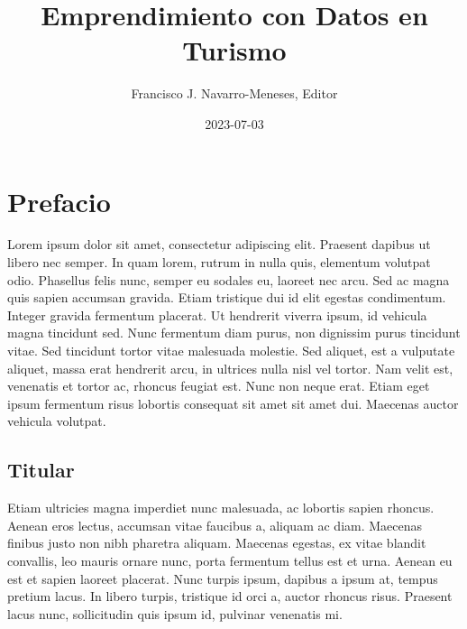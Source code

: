 \documentclass[
  letterpaper,
  DIV=11,
  numbers=noendperiod]{scrreprt}
\title{Emprendimiento con Datos en Turismo}
\author{Francisco J. Navarro-Meneses, Editor}
\date{2023-07-03}
\renewcommand*\contentsname{Table of contents}
\newcommand\contentsname{Table of contents}
\begin{document}
\maketitle
\ifdefined\Shaded\renewenvironment{Shaded}{\begin{tcolorbox}[boxrule=0pt, breakable, borderline west={3pt}{0pt}{shadecolor}, sharp corners, interior hidden, frame hidden, enhanced]}{\end{tcolorbox}}\fi

\renewcommand*\contentsname{Table of contents}
{
\hypersetup{linkcolor=}
\setcounter{tocdepth}{2}
\tableofcontents
}

\hypertarget{prefacio}{%
\chapter*{Prefacio}\label{prefacio}}


Lorem ipsum dolor sit amet, consectetur adipiscing elit. Praesent
dapibus ut libero nec semper. In quam lorem, rutrum in nulla quis,
elementum volutpat odio. Phasellus felis nunc, semper eu sodales eu,
laoreet nec arcu. Sed ac magna quis sapien accumsan gravida. Etiam
tristique dui id elit egestas condimentum. Integer gravida fermentum
placerat. Ut hendrerit viverra ipsum, id vehicula magna tincidunt sed.
Nunc fermentum diam purus, non dignissim purus tincidunt vitae. Sed
tincidunt tortor vitae malesuada molestie. Sed aliquet, est a vulputate
aliquet, massa erat hendrerit arcu, in ultrices nulla nisl vel tortor.
Nam velit est, venenatis et tortor ac, rhoncus feugiat est. Nunc non
neque erat. Etiam eget ipsum fermentum risus lobortis consequat sit amet
sit amet dui. Maecenas auctor vehicula volutpat.

\hypertarget{titular}{%
\section*{Titular}\label{titular}}


Etiam ultricies magna imperdiet nunc malesuada, ac lobortis sapien
rhoncus. Aenean eros lectus, accumsan vitae faucibus a, aliquam ac diam.
Maecenas finibus justo non nibh pharetra aliquam. Maecenas egestas, ex
vitae blandit convallis, leo mauris ornare nunc, porta fermentum tellus
est et urna. Aenean eu est et sapien laoreet placerat. Nunc turpis
ipsum, dapibus a ipsum at, tempus pretium lacus. In libero turpis,
tristique id orci a, auctor rhoncus risus. Praesent lacus nunc,
sollicitudin quis ipsum id, pulvinar venenatis mi.
\end{document}
